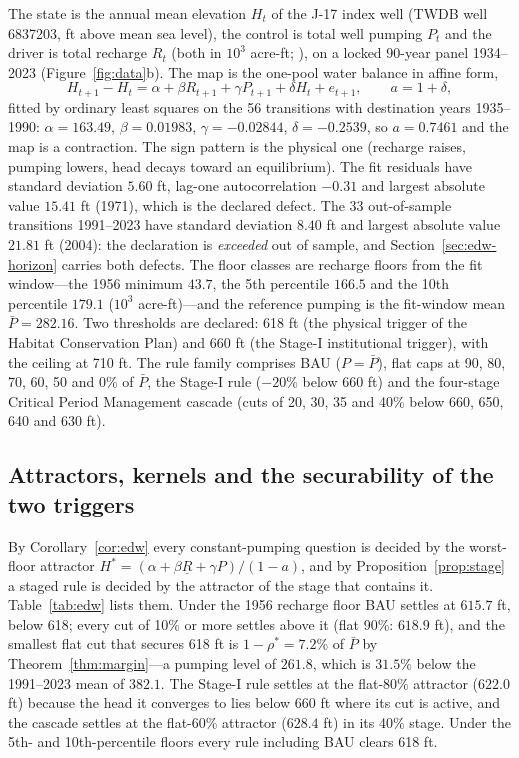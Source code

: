 \documentclass[11pt,a4paper]{article}
\theoremstyle{plain}
\theoremstyle{definition}
\theoremstyle{remark}
\newcommand{\Hstar}{H^{*}}
\newcommand{\Pbar}{\bar P}
\begin{document}
The state is the annual mean elevation $H_t$ of the J-17 index well (TWDB well 6837203, ft above mean sea level), the control is total well pumping $P_t$ and the driver is total recharge $R_t$ (both in $10^3$ acre-ft; \cite{Umphres2025,EAA2023,TWDB}), on a locked 90-year panel 1934--2023 (Figure~\ref{fig:data}b). The map is the one-pool water balance in affine form,
\begin{equation}\label{eq:edw-map}
H_{t+1}-H_t=\alpha+\beta R_{t+1}+\gamma P_{t+1}+\delta H_t+e_{t+1},\qquad a=1+\delta,
\end{equation}
fitted by ordinary least squares on the 56 transitions with destination years 1935--1990: $\alpha=163.49$, $\beta=0.01983$, $\gamma=-0.02844$, $\delta=-0.2539$, so $a=0.7461$ and the map is a contraction. The sign pattern is the physical one (recharge raises, pumping lowers, head decays toward an equilibrium). The fit residuals have standard deviation $5.60$ ft, lag-one autocorrelation $-0.31$ and largest absolute value $15.41$ ft (1971), which is the declared defect. The 33 out-of-sample transitions 1991--2023 have standard deviation $8.40$ ft and largest absolute value $21.81$ ft (2004): the declaration is \emph{exceeded} out of sample, and Section~\ref{sec:edw-horizon} carries both defects. The floor classes are recharge floors from the fit window---the 1956 minimum $43.7$, the 5th percentile $166.5$ and the 10th percentile $179.1$ ($10^3$ acre-ft)---and the reference pumping is the fit-window mean $\Pbar=282.16$. Two thresholds are declared: 618 ft (the physical trigger of the Habitat Conservation Plan) and 660 ft (the Stage-I institutional trigger), with the ceiling at 710 ft. The rule family comprises BAU ($P=\Pbar$), flat caps at 90, 80, 70, 60, 50 and 0\% of $\Pbar$, the Stage-I rule ($-20\%$ below 660 ft) and the four-stage Critical Period Management cascade (cuts of 20, 30, 35 and 40\% below 660, 650, 640 and 630 ft).

\subsection{Attractors, kernels and the securability of the two triggers}\label{sec:edw-kernels}

By Corollary~\ref{cor:edw} every constant-pumping question is decided by the worst-floor attractor $\Hstar=(\alpha+\beta\underline R+\gamma P)/(1-a)$, and by Proposition~\ref{prop:stage} a staged rule is decided by the attractor of the stage that contains it. Table~\ref{tab:edw} lists them. Under the 1956 recharge floor BAU settles at $615.7$ ft, below 618; every cut of 10\% or more settles above it (flat 90\%: $618.9$ ft), and the smallest flat cut that secures 618 ft is $1-\rho^{*}=7.2\%$ of $\Pbar$ by Theorem~\ref{thm:margin}---a pumping level of $261.8$, which is $31.5\%$ below the 1991--2023 mean of $382.1$. The Stage-I rule settles at the flat-80\% attractor ($622.0$ ft) because the head it converges to lies below 660 ft where its cut is active, and the cascade settles at the flat-60\% attractor ($628.4$ ft) in its 40\% stage. Under the 5th- and 10th-percentile floors every rule including BAU clears 618 ft.
\end{document}
